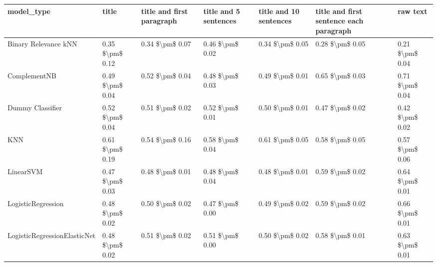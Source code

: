 \begin{tabular}{lllllll}
\toprule
                     model\_type &           title & title and first paragraph & title and 5 sentences & title and 10 sentences & title and first sentence each paragraph &            raw text \\
\midrule
           Binary Relevance kNN & 0.35 \$\textbackslash pm\$ 0.12 &           0.34 \$\textbackslash pm\$ 0.07 &       0.46 \$\textbackslash pm\$ 0.02 &        0.34 \$\textbackslash pm\$ 0.05 &                         0.28 \$\textbackslash pm\$ 0.05 &     0.21 \$\textbackslash pm\$ 0.04 \\
                   ComplementNB & 0.49 \$\textbackslash pm\$ 0.04 &           0.52 \$\textbackslash pm\$ 0.04 &       0.48 \$\textbackslash pm\$ 0.03 &        0.49 \$\textbackslash pm\$ 0.01 &                         0.65 \$\textbackslash pm\$ 0.03 &     0.71 \$\textbackslash pm\$ 0.04 \\
               Dummy Classifier & 0.52 \$\textbackslash pm\$ 0.04 &           0.51 \$\textbackslash pm\$ 0.02 &       0.52 \$\textbackslash pm\$ 0.01 &        0.50 \$\textbackslash pm\$ 0.01 &                         0.47 \$\textbackslash pm\$ 0.02 &     0.42 \$\textbackslash pm\$ 0.02 \\
                            KNN & 0.61 \$\textbackslash pm\$ 0.19 &           0.54 \$\textbackslash pm\$ 0.16 &       0.58 \$\textbackslash pm\$ 0.04 &        0.61 \$\textbackslash pm\$ 0.05 &                         0.58 \$\textbackslash pm\$ 0.05 &     0.57 \$\textbackslash pm\$ 0.06 \\
                      LinearSVM & 0.47 \$\textbackslash pm\$ 0.03 &           0.48 \$\textbackslash pm\$ 0.01 &       0.48 \$\textbackslash pm\$ 0.04 &        0.48 \$\textbackslash pm\$ 0.01 &                         0.59 \$\textbackslash pm\$ 0.02 &     0.64 \$\textbackslash pm\$ 0.01 \\
             LogisticRegression & 0.48 \$\textbackslash pm\$ 0.02 &           0.50 \$\textbackslash pm\$ 0.02 &       0.47 \$\textbackslash pm\$ 0.00 &        0.49 \$\textbackslash pm\$ 0.02 &                         0.59 \$\textbackslash pm\$ 0.02 &     0.66 \$\textbackslash pm\$ 0.01 \\
   LogisticRegressionElasticNet & 0.48 \$\textbackslash pm\$ 0.02 &           0.51 \$\textbackslash pm\$ 0.02 &       0.51 \$\textbackslash pm\$ 0.00 &        0.50 \$\textbackslash pm\$ 0.02 &                         0.58 \$\textbackslash pm\$ 0.01 &     0.63 \$\textbackslash pm\$ 0.01 \\

\end{tabular}
